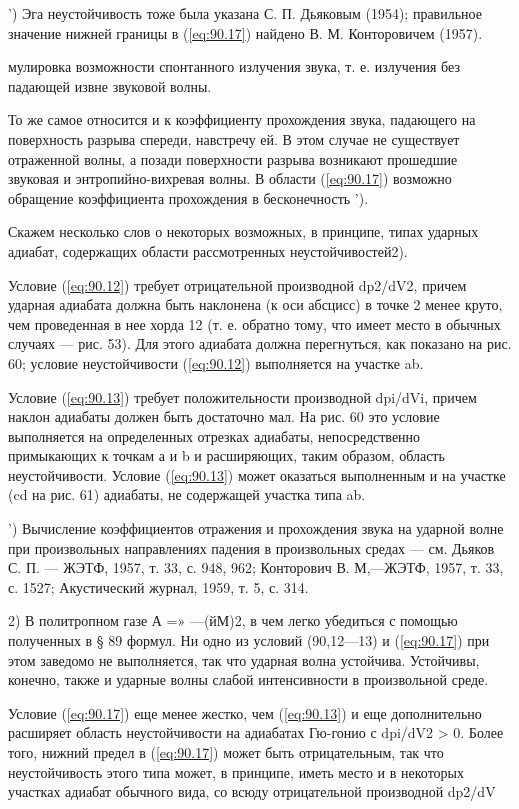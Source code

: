 ') Эга неустойчивость тоже была указана С. П. Дьяковым (1954); правильное
значение нижней границы в (\ref{eq:90.17}) найдено В. М. Конторовичем (1957).


мулировка возможности спонтанного излучения звука, т. е. излучения без падающей
извне звуковой волны.

То же самое относится и к коэффициенту прохождения звука, падающего на
поверхность разрыва спереди, навстречу ей. В этом случае не существует
отраженной волны, а позади поверхности разрыва возникают прошедшие звуковая и
энтропийно-вихревая волны. В области (\ref{eq:90.17}) возможно обращение
коэффициента прохождения в бесконечность ').

Скажем несколько слов о некоторых возможных, в принципе, типах ударных адиабат,
содержащих области рассмотренных неустойчивостей2).

Условие (\ref{eq:90.12}) требует отрицательной производной dp2/dV2, причем
ударная адиабата должна быть наклонена (к оси абсцисс) в точке 2 менее круто,
чем проведенная в нее хорда 12 (т. е. обратно тому, что имеет место в обычных
случаях — рис. 53). Для этого адиабата должна перегнуться, как показано на рис.
60; условие неустойчивости (\ref{eq:90.12}) выполняется на участке ab.


Условие (\ref{eq:90.13}) требует положительности производной dpi/dVi, причем
наклон адиабаты должен быть достаточно мал. На рис. 60 это условие выполняется
на определенных отрезках адиабаты, непосредственно примыкающих к точкам а и b и
расширяющих, таким образом, область неустойчивости. Условие (\ref{eq:90.13})
может оказаться выполненным и на участке (cd на рис. 61) адиабаты, не
содержащей участка типа ab.

') Вычисление коэффициентов отражения и прохождения звука на ударной волне при
произвольных направлениях падения в произвольных средах — см. Дьяков С. П. —
ЖЭТФ, 1957, т. 33, с. 948, 962; Конторович В. М,—ЖЭТФ, 1957, т. 33, с. 1527;
Акустический журнал, 1959, т. 5, с. 314.

2) В политропном газе А =» —(йМ)2, в чем легко убедиться с помощью полученных в
§ 89 формул. Ни одно из условий (90,12—13) и (\ref{eq:90.17}) при этом заведомо
не выполняется, так что ударная волна устойчива. Устойчивы, конечно, также и
ударные волны слабой интенсивности в произвольной среде.


Условие (\ref{eq:90.17}) еще менее жестко, чем (\ref{eq:90.13}) и еще
дополнительно расширяет область неустойчивости на адиабатах Гю-гонио с dpi/dV2
> 0. Более того, нижний предел в (\ref{eq:90.17}) может быть отрицательным, так
что неустойчивость этого типа может, в принципе, иметь место и в некоторых
участках адиабат обычного вида, со всюду отрицательной производной dp2/dV

